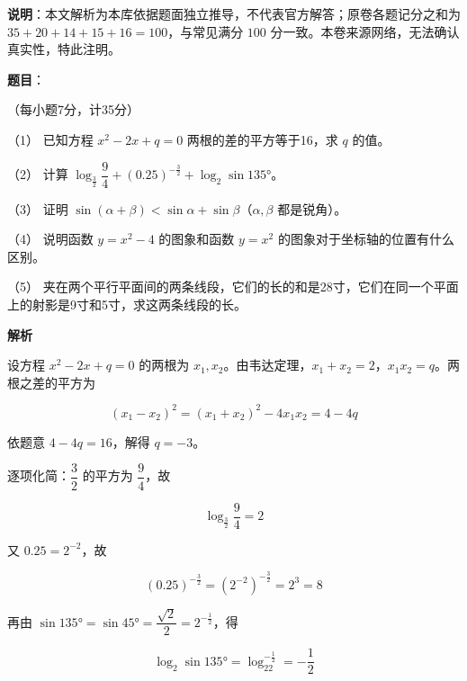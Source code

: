 

\begin{gktip}
\textbf{说明}：本文解析为本库依据题面独立推导，不代表官方解答；原卷各题记分之和为 $35+20+14+15+16=100$，与常见满分 $100$ 分一致。本卷来源网络，无法确认真实性，特此注明。
\end{gktip}

\begin{answer}

\textbf{题目}：

（每小题7分，计35分）

（1） 已知方程 $x^2-2x+q=0$ 两根的差的平方等于16，求 $q$ 的值。

（2） 计算 $\log_{\frac32}\dfrac94+(0.25)^{-\frac32}+\log_2\sin135°$。

（3） 证明 $\sin(\alpha+\beta)<\sin\alpha+\sin\beta$（$\alpha,\beta$ 都是锐角）。

（4） 说明函数 $y=x^2-4$ 的图象和函数 $y=x^2$ 的图象对于坐标轴的位置有什么区别。

（5） 夹在两个平行平面间的两条线段，它们的长的和是28寸，它们在同一个平面上的射影是9寸和5寸，求这两条线段的长。

\textbf{解析}


设方程 $x^2-2x+q=0$ 的两根为 $x_1,x_2$。由韦达定理，$x_1+x_2=2$，$x_1x_2=q$。两根之差的平方为

\nopagebreak[4]
\[
(x_1-x_2)^2=(x_1+x_2)^2-4x_1x_2=4-4q
\]

依题意 $4-4q=16$，解得 $q=-3$。


逐项化简：$\dfrac32$ 的平方为 $\dfrac94$，故

\nopagebreak[4]
\[
\log_{\frac32}\frac94=2
\]

又 $0.25=2^{-2}$，故

\nopagebreak[4]
\[
(0.25)^{-\frac32}=(2^{-2})^{-\frac32}=2^{3}=8
\]

再由 $\sin135°=\sin45°=\dfrac{\sqrt2}2=2^{-\frac12}$，得

\nopagebreak[4]
\[
\log_2\sin135°=\log_22^{-\frac12}=-\frac12
\]


\end{answer}
